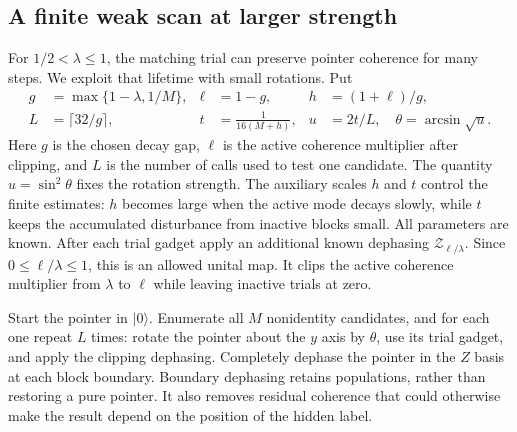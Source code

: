 \documentclass[11pt,a4paper]{article}
\numberwithin{equation}{section}
\theoremstyle{definition}
\theoremstyle{remark}
\begin{document}
\subsection{A finite weak scan at larger strength}

For $1/2<\lambda\leq1$, the matching trial can preserve pointer coherence for
many steps. We exploit that lifetime with small rotations. Put
\begin{align}
 g&=\max\{1-\lambda,1/M\},&
 \ell&=1-g,&
 h&=(1+\ell)/g,\nonumber\\
 L&=\lceil32/g\rceil,&
 t&=\frac1{16(M+h)},&
 u&=2t/L,\quad \theta=\arcsin\sqrt u.
 \label{q:weak-parameters}
\end{align}
Here $g$ is the chosen decay gap, $\ell$ is the active coherence multiplier
after clipping, and $L$ is the number of calls used to test one candidate.
The quantity $u=\sin^2\theta$ fixes the rotation strength. The auxiliary
scales $h$ and $t$ control the finite estimates: $h$ becomes large when the active mode decays slowly, while $t$ keeps the accumulated disturbance from inactive blocks small.
All parameters are known. After each trial gadget apply an additional
known dephasing $\mathcal Z_{\ell/\lambda}$. Since $0\leq\ell/\lambda\leq1$,
this is an allowed unital map. It clips the active coherence multiplier from
$\lambda$ to $\ell$ while leaving inactive trials at zero.

Start the pointer in $|0\rangle$. Enumerate all $M$ nonidentity candidates,
and for each one repeat $L$ times: rotate the pointer about the $y$ axis by
$\theta$, use its trial gadget, and apply the clipping dephasing. Completely
dephase the pointer in the $Z$ basis at each block boundary.
Boundary dephasing retains populations, rather than restoring a pure pointer.
It also removes residual coherence that could otherwise make the result depend
on the position of the hidden label.
\end{document}
